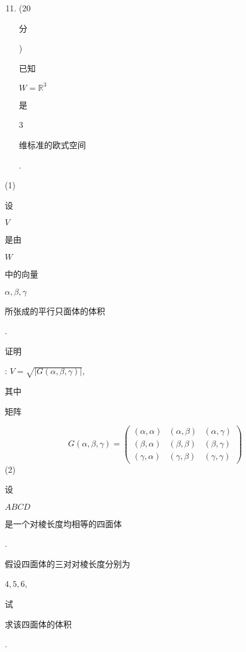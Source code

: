 \documentclass[10pt]{article}
\begin{document}
\begin{enumerate}
  \setcounter{enumi}{10}
  \item (20 \begin{CJK}{UTF8}{mj}分\end{CJK}) \begin{CJK}{UTF8}{mj}已知\end{CJK} $W=\mathbb{R}^{3}$ \begin{CJK}{UTF8}{mj}是\end{CJK} 3 \begin{CJK}{UTF8}{mj}维标准的欧式空间\end{CJK}.
\end{enumerate}
(1) \begin{CJK}{UTF8}{mj}设\end{CJK} $V$ \begin{CJK}{UTF8}{mj}是由\end{CJK} $W$ \begin{CJK}{UTF8}{mj}中的向量\end{CJK} $\alpha, \beta, \gamma$ \begin{CJK}{UTF8}{mj}所张成的平行只面体的体积\end{CJK}. \begin{CJK}{UTF8}{mj}证明\end{CJK}: $V=\sqrt{|G(\alpha, \beta, \gamma)|}$, \begin{CJK}{UTF8}{mj}其中\end{CJK} \begin{CJK}{UTF8}{mj}矩阵\end{CJK}
$$
G(\alpha, \beta, \gamma)=\left(\begin{array}{lll}
(\alpha, \alpha) & (\alpha, \beta) & (\alpha, \gamma) \\
(\beta, \alpha) & (\beta, \beta) & (\beta, \gamma) \\
(\gamma, \alpha) & (\gamma, \beta) & (\gamma, \gamma)
\end{array}\right)
$$
(2) \begin{CJK}{UTF8}{mj}设\end{CJK} $A B C D$ \begin{CJK}{UTF8}{mj}是一个对棱长度均相等的四面体\end{CJK}. \begin{CJK}{UTF8}{mj}假设四面体的三对对棱长度分别为\end{CJK} $4,5,6$, \begin{CJK}{UTF8}{mj}试\end{CJK} \begin{CJK}{UTF8}{mj}求该四面体的体积\end{CJK}.
\end{document}
